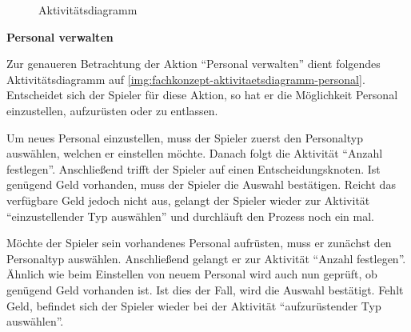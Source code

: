 \begin{figure}[htb]
  \centering
  \caption{Aktivitätsdiagramm}
  \label{img:fachkonzept-aktivitaetsdiagramm-uebersicht}
\end{figure}

\medskip

\textbf{Personal verwalten}

Zur genaueren Betrachtung der Aktion “Personal verwalten” dient folgendes Aktivitätsdiagramm auf \vref{img:fachkonzept-aktivitaetsdiagramm-personal}. Entscheidet sich der Spieler für diese Aktion, so hat er die Möglichkeit Personal einzustellen, aufzurüsten oder zu entlassen. 

Um neues Personal einzustellen, muss der Spieler zuerst den Personaltyp auswählen, welchen er einstellen möchte. Danach folgt die Aktivität “Anzahl festlegen”. Anschließend trifft der Spieler auf einen Entscheidungsknoten. Ist genügend Geld vorhanden, muss der Spieler die Auswahl bestätigen. Reicht das verfügbare Geld jedoch nicht aus, gelangt der Spieler wieder zur Aktivität “einzustellender Typ auswählen” und durchläuft den Prozess noch ein mal. 

Möchte der Spieler sein vorhandenes Personal aufrüsten, muss er zunächst den Personaltyp auswählen. Anschließend gelangt er zur Aktivität “Anzahl festlegen”. Ähnlich wie beim Einstellen von neuem Personal wird auch nun geprüft, ob genügend Geld vorhanden ist. Ist dies der Fall, wird die Auswahl bestätigt. Fehlt Geld, befindet sich der Spieler wieder bei der Aktivität “aufzurüstender Typ auswählen”.

